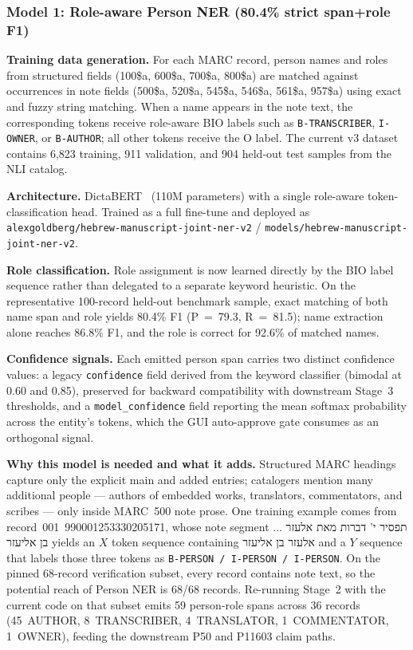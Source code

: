 \documentclass[Afour,sageh,times]{sagej}
\newcommand{\texthebrew}[1]{{\hebrewfont #1}}
\begin{document}
\subsubsection{Model 1: Role-aware Person NER (80.4\% strict span+role F1)}

\textbf{Training data generation.} For each MARC record, person names and roles from structured fields (100\$a, 600\$a, 700\$a, 800\$a) are matched against occurrences in note fields (500\$a, 520\$a, 545\$a, 546\$a, 561\$a, 957\$a) using exact and fuzzy string matching. When a name appears in the note text, the corresponding tokens receive role-aware BIO labels such as \texttt{B-TRANSCRIBER}, \texttt{I-OWNER}, or \texttt{B-AUTHOR}; all other tokens receive the O label. The current v3 dataset contains 6,823 training, 911 validation, and 904 held-out test samples from the NLI catalog.

\textbf{Architecture.} DictaBERT~\cite{shmidman2023dictabert} (110M parameters) with a single role-aware token-classification head. Trained as a full fine-tune and deployed as \texttt{alexgoldberg/hebrew-manuscript-joint-ner-v2} / \texttt{models/hebrew-manuscript-joint-ner-v2}.

\textbf{Role classification.} Role assignment is now learned directly by the BIO label sequence rather than delegated to a separate keyword heuristic. On the representative 100-record held-out benchmark sample, exact matching of both name span and role yields 80.4\% F1 (P~=~79.3, R~=~81.5); name extraction alone reaches 86.8\% F1, and the role is correct for 92.6\% of matched names.

\textbf{Confidence signals.} Each emitted person span carries two distinct confidence values: a legacy \texttt{confidence} field derived from the keyword classifier (bimodal at 0.60 and 0.85), preserved for backward compatibility with downstream Stage~3 thresholds, and a \texttt{model\_confidence} field reporting the mean softmax probability across the entity's tokens, which the GUI auto-approve gate consumes as an orthogonal signal.

\textbf{Why this model is needed and what it adds.} Structured MARC headings capture only the explicit main and added entries; catalogers mention many additional people --- authors of embedded works, translators, commentators, and scribes --- only inside MARC~500 note prose. One training example comes from record~001~990001253330205171, whose note segment \texthebrew{... תפסיר י' דברות מאת אלעזר בן אליעזר} yields an $X$ token sequence containing \texthebrew{אלעזר בן אליעזר} and a $Y$ sequence that labels those three tokens as \texttt{B-PERSON / I-PERSON / I-PERSON}. On the pinned 68-record verification subset, every record contains note text, so the potential reach of Person NER is 68/68 records. Re-running Stage~2 with the current code on that subset emits 59 person-role spans across 36 records (45~AUTHOR, 8~TRANSCRIBER, 4~TRANSLATOR, 1~COMMENTATOR, 1~OWNER), feeding the downstream P50 and P11603 claim paths.
\end{document}
